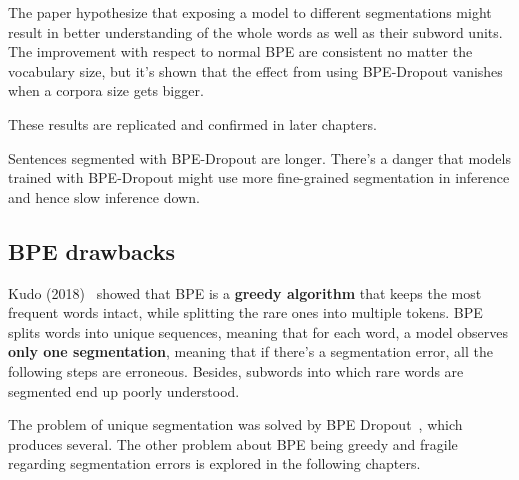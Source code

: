 The paper hypothesize that exposing a model to different segmentations might result in better understanding of the whole words as well as their subword units. The improvement with respect to normal BPE are consistent no matter the vocabulary size, but it's shown that the effect from using BPE-Dropout vanishes when a corpora size gets bigger.

These results are replicated and confirmed in later chapters.

Sentences segmented with BPE-Dropout are longer. There's a danger that models trained with BPE-Dropout might use more fine-grained segmentation in inference and hence slow inference down.

\subsection{BPE drawbacks}

Kudo (2018)~\cite{kudo-2018-subword} showed that BPE is a \textbf{greedy algorithm} that keeps the most frequent words intact, while splitting the rare ones into multiple tokens. BPE splits words into unique sequences, meaning that for each word, a model observes \textbf{only one segmentation}, meaning that if there's a segmentation error, all the following steps are erroneous. Besides, subwords into which rare words are segmented end up poorly understood.

The problem of unique segmentation was solved by BPE Dropout~\cite{provilkov2019bpedropout}, which produces several. The other problem about BPE being greedy and fragile regarding segmentation errors is explored in the following chapters.
